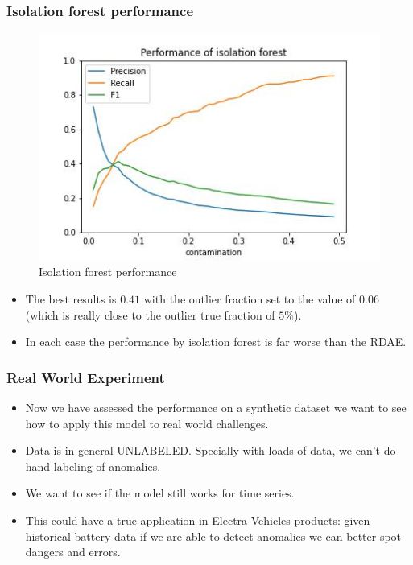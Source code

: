 \documentclass{beamer}
\theoremstyle{plain}
\theoremstyle{definition}
\theoremstyle{remark}
\begin{document}
\begin{frame}
	\frametitle{Isolation forest performance}
	\begin{figure}
		\centering
		\includegraphics[width=0.8\linewidth]{Images/isolation_forest.jpg}
		\caption[]{Isolation forest performance}
	\end{figure}
\end{frame}

\begin{frame}
	\begin{itemize}
		\item The best results is $0.41$ with the outlier fraction set to the value of $0.06$ (which is really close to the outlier true fraction of $5\%$).
		\item In each case the performance by isolation forest is far worse than the RDAE.
	\end{itemize}
\end{frame}

\begin{frame}
    \frametitle{Real World Experiment}
    \begin{itemize}
        \item Now we have assessed the performance on a synthetic dataset we want to see how to apply this model to real world challenges.
        \item Data is in general UNLABELED. Specially with loads of data, we can't do hand labeling of anomalies.
        \item We want to see if the model still works for time series.
        \item This could have a true application in Electra Vehicles products: given historical battery data if we are able to detect anomalies we can better spot dangers and errors.
    \end{itemize}
\end{frame}
\end{document}
